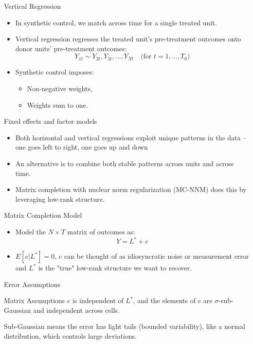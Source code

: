 \documentclass{beamer}
\begin{document}
\begin{frame}{Vertical Regression}
\small
\begin{itemize}
  \item In synthetic control, we match across time for a single treated unit.
  \item Vertical regression regresses the treated unit’s pre-treatment outcomes onto donor units’ pre-treatment outcomes:
  \[
  Y_{1t} \sim Y_{2t}, Y_{3t}, \dotsc, Y_{Nt} \quad \text{(for } t=1,\dotsc,T_0 \text{)}
  \]
  \item Synthetic control imposes:
  \begin{itemize}
    \item Non-negative weights,
    \item Weights sum to one.
  \end{itemize}
\end{itemize}
\end{frame}




\begin{frame}{Fixed effects and factor models}

\begin{itemize}
\item Both horizontal and vertical regressions exploit unique patterns in the data -- one goes left to right, one goes up and down
\item An alternative is to combine both stable patterns across units and across time.
\item Matrix completion with nuclear norm regularization (MC-NNM) does this by leveraging low-rank structure.
\end{itemize}

\end{frame}


\begin{frame}{Matrix Completion Model}
\small
\begin{itemize}
\item Model the $N \times T$ matrix of outcomes as:
\[
Y = L^* + e
\]
\item $E[e|L^*]=0$, $e$ can be thought of as idiosyncratic noise or measurement error and $L^*$ is the "true" low-rank structure we want to recover.
\end{itemize}
\end{frame}



\begin{frame}{Error Assumptions}
\small
\begin{block}{Matrix Assumptions}
$e$ is independent of $L^*$, and the elements of $e$ are $\sigma$-sub-Gaussian and independent across cells.
\end{block}

Sub-Gaussian means the error has light tails (bounded variability), like a normal distribution, which controls large deviations.

\end{frame}
\end{document}
